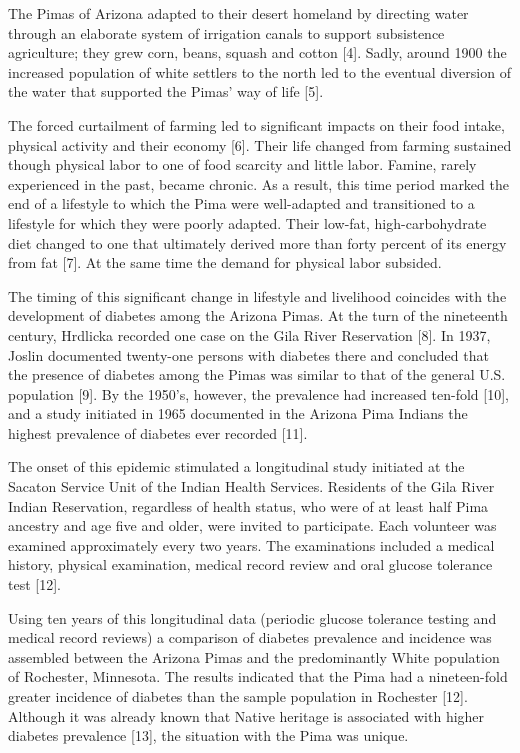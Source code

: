 \documentclass[12pt]{article}
\begin{document}
The Pimas of Arizona adapted to their desert homeland by directing water through an elaborate system of irrigation canals to support subsistence agriculture; they grew corn, beans, squash and cotton [4]. Sadly, around 1900 the increased population of white settlers to the north led to the eventual diversion of the water that supported the Pimas' way of life [5].

The forced curtailment of farming led to significant impacts on their food intake, physical activity and their economy [6]. Their life changed from farming sustained though physical labor to one of food scarcity and little labor. Famine, rarely experienced in the past, became chronic. As a result, this time period marked the end of a lifestyle to which the Pima were well-adapted and transitioned to a lifestyle for which they were poorly adapted. Their low-fat, high-carbohydrate diet changed to one that ultimately derived more than forty percent of its energy from fat [7]. At the same time the demand for physical labor subsided.

The timing of this significant change in lifestyle and livelihood coincides with the development of diabetes among the Arizona Pimas. At the turn of the nineteenth century, Hrdlicka recorded one case on the Gila River Reservation [8]. In 1937, Joslin documented twenty-one persons with diabetes there and concluded that the presence of diabetes among the Pimas was similar to that of the general U.S. population [9]. By the 1950's, however, the prevalence had increased ten-fold [10], and a study initiated in 1965 documented in the Arizona Pima Indians the highest prevalence of diabetes ever recorded [11].

The onset of this epidemic stimulated a longitudinal study initiated at the Sacaton Service Unit of the Indian Health Services. Residents of the Gila River Indian Reservation, regardless of health status, who were of at least half Pima ancestry and age five and older, were invited to participate. Each volunteer was examined approximately every two years. The examinations included a medical history, physical examination, medical record review and oral glucose tolerance test [12].

Using ten years of this longitudinal data (periodic glucose tolerance testing and medical record reviews) a comparison of diabetes prevalence and incidence was assembled between the Arizona Pimas and the predominantly White population of Rochester, Minnesota. The results indicated that the Pima had a nineteen-fold greater incidence of diabetes than the sample population in Rochester [12]. Although it was already known that Native heritage is associated with higher diabetes prevalence [13], the situation with the Pima was unique.
\end{document}
